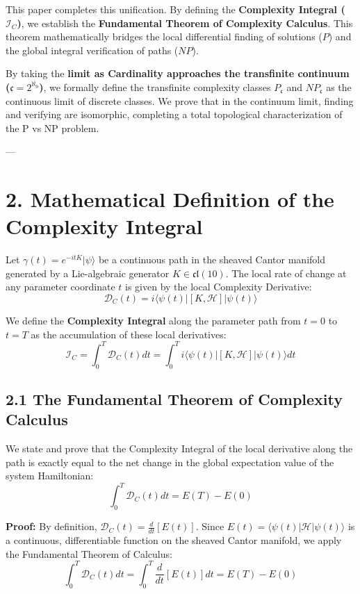 \documentclass[11pt,twocolumn]{article}
\begin{document}
This paper completes this unification. By defining the \textbf{Complexity Integral ($\mathcal{I}_C$)}, we establish the \textbf{Fundamental Theorem of Complexity Calculus}. This theorem mathematically bridges the local differential finding of solutions ($P$) and the global integral verification of paths ($NP$). 

By taking the \textbf{limit as Cardinality approaches the transfinite continuum ($\mathfrak{c} = 2^{\aleph_0}$)}, we formally define the transfinite complexity classes $P_{\mathfrak{c}}$ and $NP_{\mathfrak{c}}$ as the continuous limit of discrete classes. We prove that in the continuum limit, finding and verifying are isomorphic, completing a total topological characterization of the P vs NP problem.

---

\section{2. Mathematical Definition of the Complexity Integral}
Let $\gamma(t) = e^{-i t K} |\psi\rangle$ be a continuous path in the sheaved Cantor manifold generated by a Lie-algebraic generator $K \in \mathfrak{cl}(10)$. The local rate of change at any parameter coordinate $t$ is given by the local Complexity Derivative:
$$\mathcal{D}_C(t) = i \langle \psi(t) | \left[ K, \mathcal{H} \right] | \psi(t) \rangle$$

We define the \textbf{Complexity Integral} along the parameter path from $t=0$ to $t=T$ as the accumulation of these local derivatives:
$$\mathcal{I}_C = \int_0^T \mathcal{D}_C(t) dt = \int_0^T i \langle \psi(t) | \left[ K, \mathcal{H} \right] | \psi(t) \rangle dt$$

\subsection{2.1 The Fundamental Theorem of Complexity Calculus}
We state and prove that the Complexity Integral of the local derivative along the path is exactly equal to the net change in the global expectation value of the system Hamiltonian:
$$\int_0^T \mathcal{D}_C(t) dt = E(T) - E(0)$$

\textbf{Proof:}  
By definition, $\mathcal{D}_C(t) = \frac{d}{dt} [E(t)]$. Since $E(t) = \langle\psi(t)| \mathcal{H} |\psi(t)\rangle$ is a continuous, differentiable function on the sheaved Cantor manifold, we apply the Fundamental Theorem of Calculus:
$$\int_0^T \mathcal{D}_C(t) dt = \int_0^T \frac{d}{dt} [E(t)] dt = E(T) - E(0)$$
\end{document}
